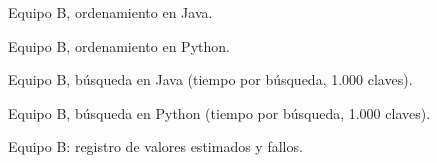 \documentclass[11pt,a4paper]{article}
\begin{document}
\begin{table}[H]
\centering
\caption{Equipo B, ordenamiento en Java.}
\end{table}
\begin{table}[H]
\centering
\caption{Equipo B, ordenamiento en Python.}
\end{table}
\begin{table}[H]
\centering
\caption{Equipo B, b\'usqueda en Java (tiempo por b\'usqueda, 1.000 claves).}
\end{table}
\begin{table}[H]
\centering
\caption{Equipo B, b\'usqueda en Python (tiempo por b\'usqueda, 1.000 claves).}
\end{table}
\begin{table}[H]
\centering
\caption{Equipo B: registro de valores estimados y fallos.}\label{tab:issuesB}
\end{table}
\end{document}
